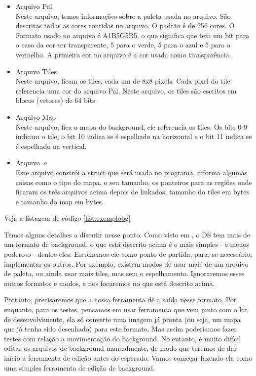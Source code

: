 \documentclass[brazil]{abnt}
\begin{document}
\begin{itemize}
 \item Arquivo Pal\\
 Neste arquivo, temos informações sobre a paleta usada no arquivo. São descritas todas as cores contidas no arquivo. O padrão é de 256 cores. O Formato usado no arquivo é A1B5G5R5, o que significa que tem um bit para o caso da cor ser transparente, 5 para o verde, 5 para o azul e 5 para o vermelho. A primeira cor no arquivo é a cor usada como transparência.
 \item Arquivo Tiles\\
 Neste arquivo, ficam os tiles, cada um de 8x8 pixels. Cada pixel do tile referencia uma cor do arquivo Pal. Neste arquivo, os tiles são escritos em blocos (vetores) de 64 bits. 
 \item Arquivo Map\\
 Neste arquivo, fica o mapa do background, ele referencia os tiles. Os bits 0-9 indicam o tile, o bit 10 indica se é espelhado na horizontal e o bit 11 indica se é espelhado na vertical.
 \item Arquivo .c\\
 Este arquivo constrói a struct que será usada no programa, informa algumas coisas como o tipo do mapa, o seu tamanho, os ponteiros para as regiões onde ficaram os três arquivos acima depois de linkados, tamanho do tiles em bytes e tamanho do map em bytes. 
\end{itemize}

Veja a listagem de código \ref{list:exemplobg}

Temos alguns detalhes a discutir nesse ponto. Como visto em \cite{DSSpec}, o DS tem mais de um formato de background, o que está descrito acima é o mais simples - e menos poderoso - dentre eles. Escolhemos ele como ponto de partida, para, se necessário, implementar os outros. Por exemplo, existem modos de usar mais de um arquivo de paleta, ou ainda usar mais tiles, mas sem o espelhamento. Ignoraremos esses outros formatos e modos, e nos focaremos no que está descrito acima.

Portanto, precisaremos que a nossa ferramenta dê a saída nesse formato. Por enquanto, para os testes, pensamos em usar ferramenta que vem junto com o kit de desenvolvimento, ela só converte uma imagem já pronta (ou seja, um mapa que já tenha sido desenhado) para este formato. Mas assim poderíamos fazer testes com relação a movimentação do background. No entanto, é muito difícil editar os arquivos de background manualmente, de modo que teremos de dar início a ferramenta de edição antes do esperado. Vamos começar fazendo ela como uma simples ferramenta de edição de background.
\end{document}
